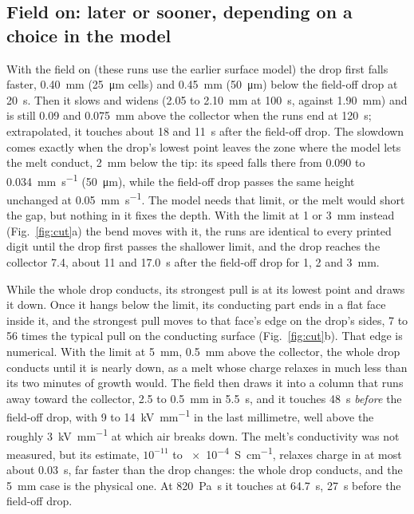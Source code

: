 \documentclass[10pt,a4paper]{article}
\begin{document}
\subsection{Field on: later or sooner, depending on a choice in the model}\label{sec:field}
With the field on (these runs use the earlier surface model) the drop first falls faster,
\qty{0.40}{\milli\metre} (\qty{25}{\micro\metre} cells)
and \qty{0.45}{\milli\metre} (\qty{50}{\micro\metre}) below the field-off drop at \qty{20}{\second}. Then
it slows and widens (2.05 to \qty{2.10}{\milli\metre} at \qty{100}{\second}, against \qty{1.90}{\milli\metre})
and is still 0.09 and \qty{0.075}{\milli\metre} above the collector when the runs end at \qty{120}{\second};
extrapolated, it touches about 18 and \qty{11}{\second} after the field-off drop. The slowdown comes exactly
when the drop's lowest point leaves the zone where the model lets the melt conduct, \qty{2}{\milli\metre}
below the tip: its speed falls there from 0.090 to \qty{0.034}{\milli\metre\per\second}
(\qty{50}{\micro\metre}), while the field-off drop passes the same height unchanged at
\qty{0.05}{\milli\metre\per\second}. The model needs that limit, or the melt would short the gap, but nothing
in it fixes the depth. With the limit at 1 or \qty{3}{\milli\metre} instead (Fig.~\ref{fig:cut}a) the bend
moves with it, the runs are identical to every printed digit until the drop first passes the shallower
limit, and the drop reaches the collector 7.4, about 11 and \qty{17.0}{\second} after the field-off drop
for 1, 2 and \qty{3}{\milli\metre}.

While the whole drop conducts, its strongest pull is at its lowest point and draws it down. Once it hangs
below the limit, its conducting part ends in a flat face inside it, and the strongest pull moves to that
face's edge on the drop's sides, 7 to 56 times the typical pull on the conducting surface
(Fig.~\ref{fig:cut}b). That edge is numerical. With the limit at \qty{5}{\milli\metre}, \qty{0.5}{\milli\metre}
above the collector, the whole drop conducts until it is nearly down, as a melt whose charge relaxes in much
less than its two minutes of growth would. The field then draws it into a column that runs away toward the
collector, 2.5 to \qty{0.5}{\milli\metre} in \qty{5.5}{\second}, and it touches \qty{48}{\second}
\emph{before} the field-off drop, with 9 to \qty{14}{\kilo\volt\per\milli\metre} in the last millimetre,
well above the roughly \qty{3}{\kilo\volt\per\milli\metre} at which air breaks down. The melt's conductivity
was not measured, but its estimate, $10^{-11}$ to \qty{e-4}{\siemens\per\centi\metre}, relaxes charge in at
most about \qty{0.03}{\second}, far faster than the drop changes: the whole drop conducts, and the
\qty{5}{\milli\metre} case is the physical one. At \qty{820}{\pascal\second} it touches at
\qty{64.7}{\second}, \qty{27}{\second} before the field-off drop.
\end{document}
